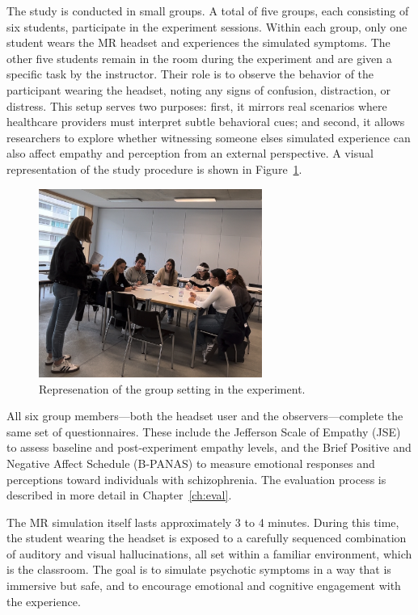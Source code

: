 The study is conducted in small groups. A total of five groups, each consisting of six students, participate in the experiment sessions. Within each group, only one student wears the MR headset and experiences the simulated symptoms. The other five students remain in the room during the experiment and are given a specific task by the instructor. Their role is to observe the behavior of the participant wearing the headset, noting any signs of confusion, distraction, or distress. This setup serves two purposes: first, it mirrors real scenarios where healthcare providers must interpret subtle behavioral cues; and second, it allows researchers to explore whether witnessing someone elses simulated experience can also affect empathy and perception from an external perspective. A visual representation of the study procedure is shown in Figure~\ref{fig:group-setting}.

\begin{figure}[htbp]
    \centering
    \includegraphics[width=0.65\textwidth]{../../Figures/Group-setting-02.jpg}
    \caption{Represenation of the group setting in the experiment.}
    \label{fig:group-setting}
\end{figure}

\vspace{1em}

All six group members—both the headset user and the observers—complete the same set of questionnaires. These include the Jefferson Scale of Empathy (JSE) \cite{Hojat2002} to assess baseline and post-experiment empathy levels, and the Brief Positive and Negative Affect Schedule (B-PANAS) \cite{Boiroux2024} to measure emotional responses and perceptions toward individuals with schizophrenia. The evaluation process is described in more detail in Chapter~\ref{ch:eval}.

The MR simulation itself lasts approximately 3 to 4 minutes. During this time, the student wearing the headset is exposed to a carefully sequenced combination of auditory and visual hallucinations, all set within a familiar environment, which is the classroom. The goal is to simulate psychotic symptoms in a way that is immersive but safe, and to encourage emotional and cognitive engagement with the experience.

